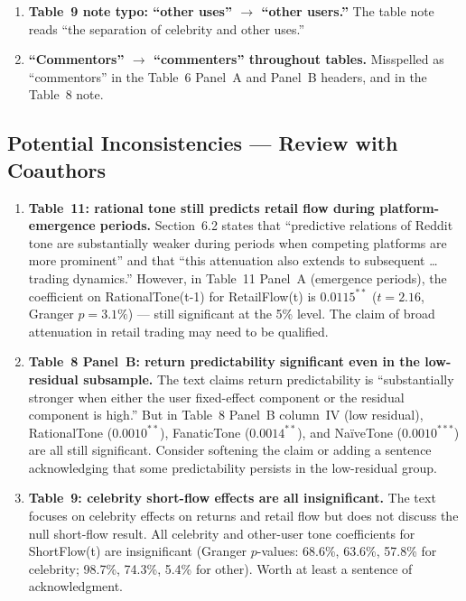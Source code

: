\documentclass[11pt]{article}
\newcommand{\fix}{\textcolor{fix}{$\square$}}
\newcommand{\check}{\textcolor{check}{$\square$}}
\begin{document}
\begin{enumerate}[leftmargin=*, label=\fix]
  \item \textbf{Table~9 note typo: ``other uses'' $\to$ ``other
    users.''} The table note reads ``the separation of celebrity and
    other uses.''

  \item \textbf{``Commentors'' $\to$ ``commenters'' throughout tables.}
    Misspelled as ``commentors'' in the Table~6 Panel~A and Panel~B
    headers, and in the Table~8 note.

\end{enumerate}

\subsection{Potential Inconsistencies --- Review with Coauthors}

\begin{enumerate}[leftmargin=*, label=\check]

  \item \textbf{Table~11: rational tone still predicts retail flow
    during platform-emergence periods.} Section~6.2 states that
    ``predictive relations of Reddit tone are substantially weaker
    during periods when competing platforms are more prominent'' and
    that ``this attenuation also extends to subsequent \ldots trading
    dynamics.'' However, in Table~11 Panel~A (emergence periods), the
    coefficient on RationalTone(t-1) for RetailFlow(t) is $0.0115^{**}$
    ($t=2.16$, Granger $p=3.1\%$) --- still significant at the 5\%
    level. The claim of broad attenuation in retail trading may need
    to be qualified.

  \item \textbf{Table~8 Panel~B: return predictability significant
    even in the low-residual subsample.} The text claims return
    predictability is ``substantially stronger when either the
    user fixed-effect component or the residual component is high.''
    But in Table~8 Panel~B column~IV (low residual), RationalTone
    ($0.0010^{**}$), FanaticTone ($0.0014^{**}$), and Na\"{i}veTone
    ($0.0010^{***}$) are all still significant. Consider softening the
    claim or adding a sentence acknowledging that some predictability
    persists in the low-residual group.

  \item \textbf{Table~9: celebrity short-flow effects are all
    insignificant.} The text focuses on celebrity effects on returns
    and retail flow but does not discuss the null short-flow result.
    All celebrity and other-user tone coefficients for ShortFlow(t)
    are insignificant (Granger $p$-values: 68.6\%, 63.6\%, 57.8\%
    for celebrity; 98.7\%, 74.3\%, 5.4\% for other). Worth at least
    a sentence of acknowledgment.

\end{enumerate}
\end{document}
